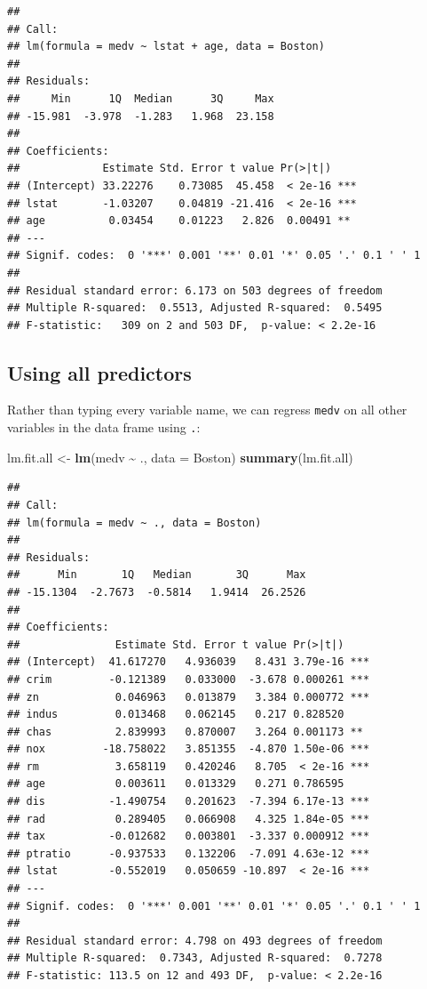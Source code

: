 \documentclass[
  11pt,
]{article}
\newenvironment{Shaded}{\begin{snugshade}}{\end{snugshade}}
\newcommand{\AttributeTok}[1]{\textcolor[rgb]{0.13,0.29,0.53}{#1}}
\newcommand{\FunctionTok}[1]{\textcolor[rgb]{0.13,0.29,0.53}{\textbf{#1}}}
\newcommand{\NormalTok}[1]{#1}
\newcommand{\OtherTok}[1]{\textcolor[rgb]{0.56,0.35,0.01}{#1}}
\newcommand{\SpecialCharTok}[1]{\textcolor[rgb]{0.81,0.36,0.00}{\textbf{#1}}}
\begin{document}
\begin{verbatim}
## 
## Call:
## lm(formula = medv ~ lstat + age, data = Boston)
## 
## Residuals:
##     Min      1Q  Median      3Q     Max 
## -15.981  -3.978  -1.283   1.968  23.158 
## 
## Coefficients:
##             Estimate Std. Error t value Pr(>|t|)    
## (Intercept) 33.22276    0.73085  45.458  < 2e-16 ***
## lstat       -1.03207    0.04819 -21.416  < 2e-16 ***
## age          0.03454    0.01223   2.826  0.00491 ** 
## ---
## Signif. codes:  0 '***' 0.001 '**' 0.01 '*' 0.05 '.' 0.1 ' ' 1
## 
## Residual standard error: 6.173 on 503 degrees of freedom
## Multiple R-squared:  0.5513, Adjusted R-squared:  0.5495 
## F-statistic:   309 on 2 and 503 DF,  p-value: < 2.2e-16
\end{verbatim}

\subsection{Using all predictors}\label{using-all-predictors}

Rather than typing every variable name, we can regress \texttt{medv} on
all other variables in the data frame using \texttt{.}:

\begin{Shaded}
\begin{Highlighting}[]
\NormalTok{lm.fit.all }\OtherTok{\textless{}{-}} \FunctionTok{lm}\NormalTok{(medv }\SpecialCharTok{\textasciitilde{}}\NormalTok{ ., }\AttributeTok{data =}\NormalTok{ Boston)}
\FunctionTok{summary}\NormalTok{(lm.fit.all)}
\end{Highlighting}
\end{Shaded}

\begin{verbatim}
## 
## Call:
## lm(formula = medv ~ ., data = Boston)
## 
## Residuals:
##      Min       1Q   Median       3Q      Max 
## -15.1304  -2.7673  -0.5814   1.9414  26.2526 
## 
## Coefficients:
##               Estimate Std. Error t value Pr(>|t|)    
## (Intercept)  41.617270   4.936039   8.431 3.79e-16 ***
## crim         -0.121389   0.033000  -3.678 0.000261 ***
## zn            0.046963   0.013879   3.384 0.000772 ***
## indus         0.013468   0.062145   0.217 0.828520    
## chas          2.839993   0.870007   3.264 0.001173 ** 
## nox         -18.758022   3.851355  -4.870 1.50e-06 ***
## rm            3.658119   0.420246   8.705  < 2e-16 ***
## age           0.003611   0.013329   0.271 0.786595    
## dis          -1.490754   0.201623  -7.394 6.17e-13 ***
## rad           0.289405   0.066908   4.325 1.84e-05 ***
## tax          -0.012682   0.003801  -3.337 0.000912 ***
## ptratio      -0.937533   0.132206  -7.091 4.63e-12 ***
## lstat        -0.552019   0.050659 -10.897  < 2e-16 ***
## ---
## Signif. codes:  0 '***' 0.001 '**' 0.01 '*' 0.05 '.' 0.1 ' ' 1
## 
## Residual standard error: 4.798 on 493 degrees of freedom
## Multiple R-squared:  0.7343, Adjusted R-squared:  0.7278 
## F-statistic: 113.5 on 12 and 493 DF,  p-value: < 2.2e-16
\end{verbatim}
\end{document}
